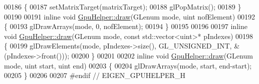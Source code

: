 \begin{DoxyCode}
00186 \{
00187     setMatrixTarget(matrixTarget);
00188     glPopMatrix();
00189 \}
00190 
00191 \textcolor{keyword}{inline} \textcolor{keywordtype}{void} \hyperlink{class_gpu_helper_a154eb0bf7bf7c764dccb874ce38af766}{GpuHelper::draw}(GLenum mode, uint nofElement)
00192 \{
00193     glDrawArrays(mode, 0, nofElement);
00194 \}
00195 
00196 
00197 \textcolor{keyword}{inline} \textcolor{keywordtype}{void} \hyperlink{class_gpu_helper_a154eb0bf7bf7c764dccb874ce38af766}{GpuHelper::draw}(GLenum mode, \textcolor{keyword}{const} std::vector<uint>* pIndexes)
00198 \{
00199     glDrawElements(mode, pIndexes->size(), GL\_UNSIGNED\_INT, &(pIndexes->front()));
00200 \}
00201 
00202 \textcolor{keyword}{inline} \textcolor{keywordtype}{void} \hyperlink{class_gpu_helper_a154eb0bf7bf7c764dccb874ce38af766}{GpuHelper::draw}(GLenum mode, uint start, uint end)
00203 \{
00204     glDrawArrays(mode, start, end-start);
00205 \}
00206 
00207 \textcolor{preprocessor}{#endif // EIGEN\_GPUHELPER\_H}
\end{DoxyCode}
